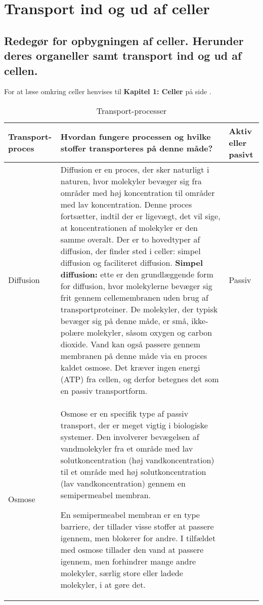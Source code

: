 \newpage
\section{Transport ind og ud af celler}
    \subsection{Redegør for opbygningen af celler. Herunder deres organeller samt transport ind og ud af cellen.}
        For at læse omkring celler henvises til \textbf{Kapitel 1: Celler} på side \pageref{sec:celletyperogderesorganeller}.
        \begin{center}
            \begin{longtable}{ | m{2cm} | m{11cm}| m{2cm} |}
                \caption{Transport-processer} \\
                \hline
                \textbf{Transport-proces} & \textbf{Hvordan fungere processen og hvilke stoffer transporteres på denne måde?} & \textbf{Aktiv eller pasivt}\\
                \hline
                Diffusion & Diffusion er en proces, der sker naturligt i naturen, hvor molekyler bevæger sig fra områder med høj koncentration til områder med lav koncentration. 
                Denne proces fortsætter, indtil der er ligevægt, det vil sige, at koncentrationen af molekyler er den samme overalt. Der er to hovedtyper af diffusion, der finder sted i celler: 
                simpel diffusion og faciliteret diffusion. \textbf{Simpel diffusion:}  ette er den grundlæggende form for diffusion, hvor molekylerne bevæger sig frit gennem cellemembranen uden brug af transportproteiner. 
                De molekyler, der typisk bevæger sig på denne måde, er små, ikke-polære molekyler, såsom oxygen og carbon dioxide. Vand kan også passere gennem membranen på denne måde via en proces kaldet osmose. Det kræver ingen energi (ATP) fra cellen, og derfor betegnes det som en passiv transportform. & Passiv\\
                \hline
                Osmose & Osmose er en specifik type af passiv transport, der er meget vigtig i biologiske systemer. Den involverer bevægelsen af vandmolekyler fra et område med lav solutkoncentration (høj vandkoncentration) til et område med høj solutkoncentration (lav vandkoncentration) gennem en semipermeabel membran.

                En semipermeabel membran er en type barriere, der tillader visse stoffer at passere igennem, men blokerer for andre. I tilfældet med osmose tillader den vand at passere igennem, men forhindrer mange andre molekyler, særlig store eller ladede molekyler, i at gøre det.
                

\end{longtable}
\end{center}
